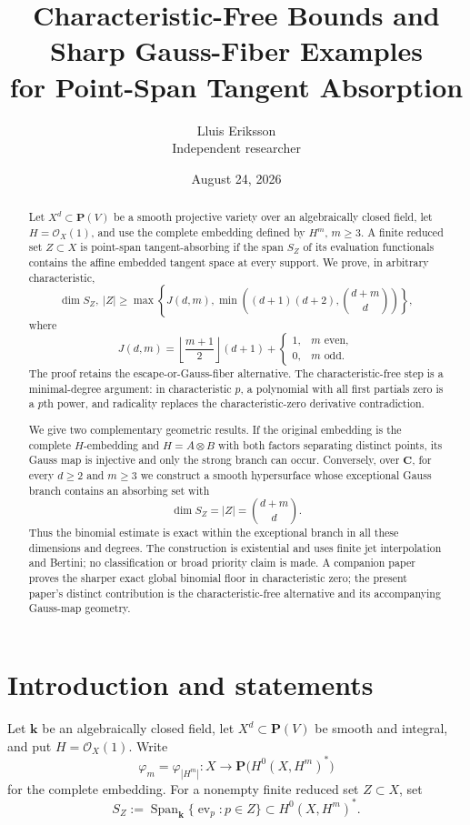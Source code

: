 \documentclass[11pt]{article}
\title{Characteristic-Free Bounds and Sharp Gauss-Fiber Examples\\
for Point-Span Tangent Absorption}
\author{Lluis Eriksson\\\small Independent researcher}
\date{August 24, 2026}
\newcommand{\PP}{\mathbf P}
\newcommand{\CC}{\mathbf C}
\newcommand{\kk}{\mathbf k}
\newcommand{\cO}{\mathcal O}
\newcommand{\Span}{\operatorname{Span}}
\begin{document}
\maketitle

\begin{abstract}
Let $X^d\subset\PP(V)$ be a smooth projective variety over an algebraically
closed field, let $H=\cO_X(1)$, and use the complete embedding defined by
$H^m$, $m\geq3$.  A finite reduced set $Z\subset X$ is point-span
tangent-absorbing if the span $S_Z$ of its evaluation functionals contains the
affine embedded tangent space at every support.  We prove, in arbitrary
characteristic,
\[
 \dim S_Z,\ |Z|\geq
 \max\left\{J(d,m),
 \min\left((d+1)(d+2),\binom{d+m}{d}\right)\right\},
\]
where
\[
 J(d,m)=\left\lfloor\frac{m+1}{2}\right\rfloor(d+1)
       +\begin{cases}1,&m\text{ even},\\0,&m\text{ odd}.
         \end{cases}
\]
The proof retains the escape-or-Gauss-fiber alternative.  The
characteristic-free step is a minimal-degree argument: in characteristic
$p$, a polynomial with all first partials zero is a $p$th power, and
radicality replaces the characteristic-zero derivative contradiction.

We give two complementary geometric results.  If the original embedding is
the complete $H$-embedding and $H=A\otimes B$ with both factors separating
distinct points, its Gauss map is injective and only the strong branch can
occur.  Conversely, over
$\CC$, for every $d\geq2$ and $m\geq3$ we construct a smooth hypersurface
whose exceptional Gauss branch contains an absorbing set with
\[
 \dim S_Z=|Z|=\binom{d+m}{d}.
\]
Thus the binomial estimate is exact within the exceptional branch in all
these dimensions and degrees.  The construction is existential and uses
finite jet interpolation and Bertini; no classification or broad priority
claim is made.  A companion paper proves the sharper exact global binomial
floor in characteristic zero; the present paper's distinct contribution is
the characteristic-free alternative and its accompanying Gauss-map geometry.
\end{abstract}

\section{Introduction and statements}

Let $\kk$ be an algebraically closed field, let
$X^d\subset\PP(V)$ be smooth and integral, and put $H=\cO_X(1)$.  Write
\[
 \varphi_m=\varphi_{|H^m|}:X\longrightarrow
 \PP\bigl(H^0(X,H^m)^*\bigr)
\]
for the complete embedding.  For a nonempty finite reduced set $Z\subset X$,
set
\[
 S_Z:=\Span_{\kk}\{\operatorname{ev}_p:p\in Z\}
       \subset H^0(X,H^m)^*.
\]
\end{document}
